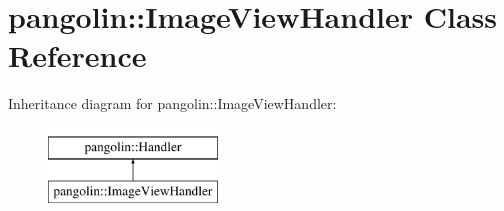 \hypertarget{classpangolin_1_1_image_view_handler}{}\section{pangolin\+:\+:Image\+View\+Handler Class Reference}
\label{classpangolin_1_1_image_view_handler}
Inheritance diagram for pangolin\+:\+:Image\+View\+Handler\+:\begin{figure}[H]
\begin{center}
\leavevmode
\includegraphics[height=2.000000cm]{classpangolin_1_1_image_view_handler}
\end{center}
\end{figure}
